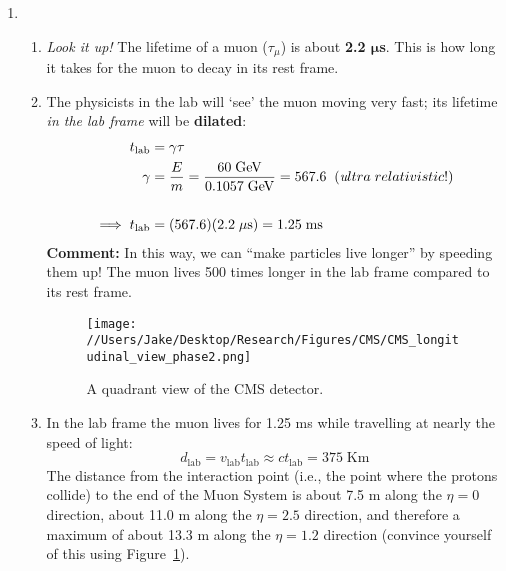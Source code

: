 \documentclass[11pt]{article}
\begin{document}
\begin{enumerate}
\item 
    \begin{enumerate}

        \item \emph{Look it up!} The lifetime of a muon ($\tau_{\mu}$) is about \textbf{2.2 $\bm{\mu}$s}. 
        This is how long it takes for the muon to decay in its rest frame. 

        \item The physicists in the lab will `see' the muon moving very fast; 
        its lifetime \emph{in the lab frame} will be \textbf{dilated}:
        \begin{align*}
            t_\mathrm{lab} &= \gamma \tau \\
            \gamma &= \frac{E}{m} 
            = \frac{\mathrm{60 \;GeV}}{\mathrm{0.1057 \;GeV}}
            = 567.6 \;\;({\textit ultra\;relativistic!}) \\ \\
            \implies t_\mathrm{lab} &= (567.6) (2.2\;\mathrm{\mu s}) = 1.25 \mathrm{\;ms}
        \end{align*}
        {\centering \textbf{Comment:} In this way, we can ``make particles live longer''
        by speeding them up! 
        The muon lives 500 times longer in the lab frame compared to
        its rest frame.
        }

        \begin{figure}[pt]
        \centering
        \texttt{[image: //Users/Jake/Desktop/Research/Figures/CMS/CMS\_longitudinal\_view\_phase2.png]}
            \caption{A quadrant view of the CMS detector.} 
        \label{fig:longitude_CMS}
        \end{figure}

        \item 
        In the lab frame the muon lives for 1.25 ms while travelling at nearly
        the speed of light:
        $$d_\mathrm{lab} = v_\mathrm{lab} t_\mathrm{lab} \approx c t_\mathrm{lab} = 375 \mathrm{\;Km}$$
        The distance from the interaction point 
        (i.e., the point where the protons collide) to the end of the Muon System is 
        about 7.5 m along the $\eta = 0$ direction, 
        about 11.0 m along the $\eta = 2.5$ direction, and therefore a maximum of
        about 13.3 m along the $\eta = 1.2$ direction 
        (convince yourself of this using Figure~\ref{fig:longitude_CMS}).
        

\end{enumerate}
\end{enumerate}
\end{document}
